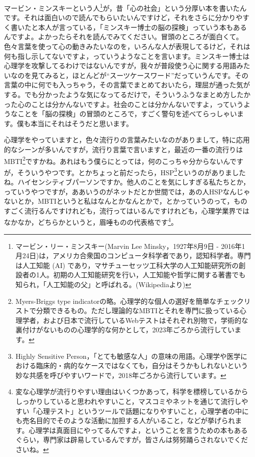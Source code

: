 \documentclass{ltjsbook}
\begin{document}
マービン・ミンスキーという人\footnote{マービン・リー・ミンスキー(Marvin Lee Minsky，1927年8月9日 - 2016年1月24日)は，アメリカ合衆国のコンピュータ科学者であり，認知科学者。専門は人工知能 (AI) であり，マサチューセッツ工科大学の人工知能研究所の創設者の1人。初期の人工知能研究を行い，人工知能や哲学に関する著書でも知られ，「人工知能の父」と呼ばれる。(Wikipediaより)}が，昔「心の社会」という分厚い本を書いたんです\parencite{minsky1990}。それは面白いので読んでもらいたいんですけど，それをさらに分かりやすく書いたと本人が言っている，「ミンスキー博士の脳の探検」っていう本もあるんですよ\parencite{minsky2009}。よかったらそれを読んでみてください。冒頭のところが面白くて。色々言葉を使って心の動きみたいなのを，いろんな人が表現してるけど，それは何も指し示してないですよ，っていうようなことを言います。ミンスキー博士は心理学を攻撃してるわけではないんですが，我々が普段使う心に関する用語みたいなのを見てみると，ほとんどが``スーツケースワード''だっていうんです。その言葉の中に何でも入っちゃう，その言葉でまとめておいたら，理屈が通った気がする。でも分かったような気になってるだけで，そういうふうなまとめ方したかった心のことは分かんないですよ。社会のことは分かんないですよ，っていうようなことを「脳の探検」の冒頭のところで，すごく警句を述べてらっしゃいます。僕も本当にそれはそうだと思います。

心理学をやっていますと，色々流行りの言葉みたいなのがありまして，特に応用的なシーンが多いんですが，流行り言葉で言いますと，最近の一番の流行りはMBTI\footnote{Myers-Briggs type indicatorの略。心理学的な個人の選好を簡単なチェックリストで分類できるもの。ただし理論的なMBTIとそれを専門に扱っている心理学者，および日本で流行しているWebテストはそれぞれ別物で，学術的な裏付けがないものの心理学的な何かとして，2023年ごろから流行しています。}ですかね。あれはもう僕らにとっては，何のこっちゃ分からないんですが，そういうやつです。とかちょっと前だったら，HSP\footnote{Highly Sensitive Person，「とても敏感な人」の意味の用語。心理学や医学における臨床的・病的なケースではなくても，自分はそうかもしれないという妙な共感を呼びやすいワードで，2018年ごろから流行しています。}というのがありましたね。ハイセンシティブパーソンですか。他人のことを気にしすぎる私たちとか，っていうやつですが，ああいうのがネットだとか世間では，あの人HSPなんじゃないとか，MBTIというと私はなんとかなんとかで，とかっていうのって，ものすごく流行るんですけれども，流行ってはいるんですけれども，心理学業界ではなかなか，どちらかというと，眉唾ものの代表格です\footnote{変な心理学が流行りやすい理由はいくつかあって，科学を標榜しているからしっかりしていると思われやすいこと，マスコミやネットを通じて流行しやすい「心理テスト」というツールで話題になりやすいこと，心理学者の中にも売名目的でそのような活動に加担する人がいること，などが挙げられます。心理学は真面目にやってるんですよ，ということを言うための本\parencite{Keith2016}もあるぐらい，専門家は辟易しているんですが，皆さんは努努踊らされないでくださいね。}。
\end{document}
